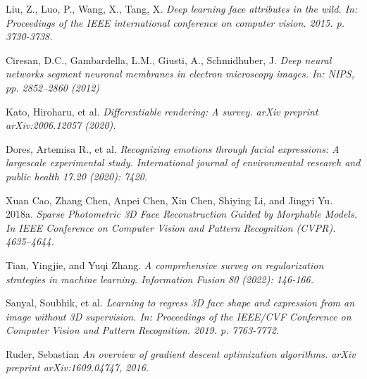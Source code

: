 \documentclass[12pt,a4]{article}
\begin{document}
\begin{thebibliography}{9}
    Liu, Z., Luo, P., Wang, X., Tang, X.
    \textit{Deep learning face attributes in the wild. In: Proceedings of the IEEE international conference on computer vision. 2015. p. 3730-3738.}

    Ciresan, D.C., Gambardella, L.M., Giusti, A., Schmidhuber, J.
    \textit{Deep neural networks segment neuronal membranes in electron microscopy images. In: NIPS, pp. 2852–2860 (2012)}

    Kato, Hiroharu, et al.
    \textit{Differentiable rendering: A survey. arXiv preprint arXiv:2006.12057 (2020).}

    Dores, Artemisa R., et al.
    \textit{Recognizing emotions through facial expressions: A largescale experimental study. International journal of environmental research and public health 17.20 (2020): 7420.}

    Xuan Cao, Zhang Chen, Anpei Chen, Xin Chen, Shiying Li, and Jingyi Yu. 2018a.
    \textit{Sparse Photometric 3D Face Reconstruction Guided by Morphable Models. In    IEEE Conference on Computer Vision and Pattern Recognition (CVPR). 4635–4644.}

    Tian, Yingjie, and Yuqi Zhang.
    \textit{A comprehensive survey on regularization strategies in machine learning. Information Fusion 80 (2022): 146-166.}

    Sanyal, Soubhik, et al.
    \textit{Learning to regress 3D face shape and expression from an image without 3D supervision. In: Proceedings of the IEEE/CVF Conference on Computer Vision and Pattern Recognition. 2019. p. 7763-7772.}
    

    Ruder, Sebastian
    \textit{An overview of gradient descent optimization algorithms. arXiv preprint arXiv:1609.04747, 2016.}

	\end{thebibliography}
 
\end{document}
